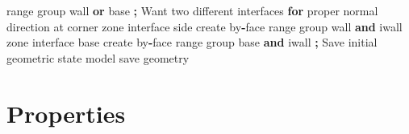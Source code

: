 \documentclass[a4paper, nobind]{templates/ociamthesis}
\newenvironment{Shaded}{\begin{snugshade}}{\end{snugshade}}
\newcommand{\BuiltInTok}[1]{#1}
\newcommand{\ControlFlowTok}[1]{\textcolor[rgb]{0.13,0.29,0.53}{\textbf{#1}}}
\newcommand{\KeywordTok}[1]{\textcolor[rgb]{0.13,0.29,0.53}{\textbf{#1}}}
\newcommand{\NormalTok}[1]{#1}
\newcommand{\OperatorTok}[1]{\textcolor[rgb]{0.81,0.36,0.00}{\textbf{#1}}}
\newcommand{\StringTok}[1]{\textcolor[rgb]{0.31,0.60,0.02}{#1}}
\renewenvironment{Shaded}
{
  \vspace{10pt}%
  \begin{snugshade}%
}{%
  \end{snugshade}%
  \vspace{8pt}%
}
\begin{document}
\begin{Shaded}
\begin{Highlighting}[]
     \BuiltInTok{range}\NormalTok{ group }\StringTok{\textquotesingle{}wall\textquotesingle{}} \KeywordTok{or} \StringTok{\textquotesingle{}base\textquotesingle{}}
\OperatorTok{;}\NormalTok{ Want two different interfaces }\ControlFlowTok{for}\NormalTok{ proper normal direction at corner}
\NormalTok{zone interface }\StringTok{\textquotesingle{}side\textquotesingle{}}\NormalTok{ create by}\OperatorTok{{-}}\NormalTok{face }\BuiltInTok{range}\NormalTok{ group }\StringTok{\textquotesingle{}wall\textquotesingle{}} \KeywordTok{and} \StringTok{\textquotesingle{}iwall\textquotesingle{}}
\NormalTok{zone interface }\StringTok{\textquotesingle{}base\textquotesingle{}}\NormalTok{ create by}\OperatorTok{{-}}\NormalTok{face }\BuiltInTok{range}\NormalTok{ group }\StringTok{\textquotesingle{}base\textquotesingle{}} \KeywordTok{and} \StringTok{\textquotesingle{}iwall\textquotesingle{}}
\OperatorTok{;}\NormalTok{ Save initial geometric state}
\NormalTok{model save }\StringTok{\textquotesingle{}geometry\textquotesingle{}}
\end{Highlighting}
\end{Shaded}

\hypertarget{properties-1}{%
\section{Properties}\label{properties-1}}
\end{document}
